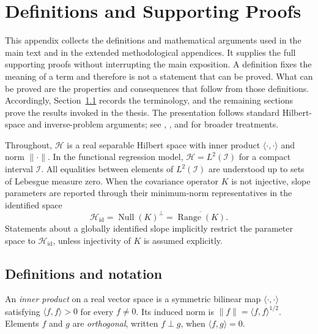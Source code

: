 \chapter{Definitions and Supporting Proofs}
\label{app:mathematical-proofs}

This appendix collects the definitions and mathematical arguments used in
the main text and in the extended methodological appendices.  It supplies
the full supporting proofs without interrupting the main exposition.  A definition fixes the meaning of a term and therefore is not a
statement that can be proved.  What can be proved are the properties and
consequences that follow from those definitions.  Accordingly,
Section~\ref{sec:app-definitions} records the terminology, and the remaining
sections prove the results invoked in the thesis.  The presentation follows
standard Hilbert-space and inverse-problem arguments; see
\textcite{lin_mit_18102_2021}, \textcite{hsing_eubank_2015}, and
\textcite{engl_hanke_neubauer_1996} for broader treatments.

Throughout, $\mathcal H$ is a real separable Hilbert space with inner product
$\langle\cdot,\cdot\rangle$ and norm $\|\cdot\|$.  In the functional
regression model, $\mathcal H=L^2(\mathcal I)$ for a compact interval
$\mathcal I$.  All equalities between elements of $L^2(\mathcal I)$ are
understood up to sets of Lebesgue measure zero.
When the covariance operator $K$ is not injective, slope parameters are
reported through their minimum-norm representatives in the identified space
\[
    \mathcal H_{\mathrm{id}}
    =\operatorname{Null}(K)^\perp
    =\overline{\operatorname{Range}(K)}.
\]
Statements about a globally identified slope implicitly restrict the
parameter space to $\mathcal H_{\mathrm{id}}$, unless injectivity of $K$ is
assumed explicitly.

\section{Definitions and notation}
\label{sec:app-definitions}

\begin{definition}
An \emph{inner product} on a real vector space is a symmetric bilinear map
$\langle\cdot,\cdot\rangle$ satisfying $\langle f,f\rangle>0$ for every
$f\neq0$.  Its induced norm is $\|f\|=\langle f,f\rangle^{1/2}$.  Elements
$f$ and $g$ are \emph{orthogonal}, written $f\perp g$, when
$\langle f,g\rangle=0$.
\end{definition}

